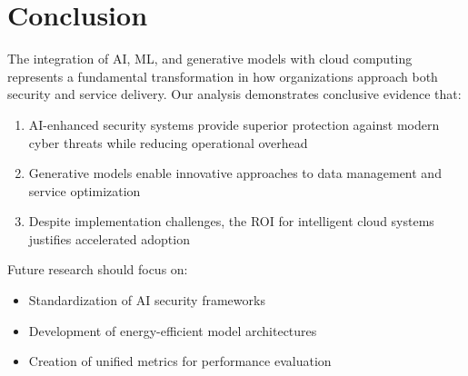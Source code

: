 \documentclass[a4paper,12pt]{article}
\begin{document}
\section{Conclusion}
The integration of AI, ML, and generative models with cloud computing represents a fundamental transformation in how organizations approach both security and service delivery. Our analysis demonstrates conclusive evidence that:
\begin{enumerate}
    \item AI-enhanced security systems provide superior protection against modern cyber threats while reducing operational overhead
    \item Generative models enable innovative approaches to data management and service optimization
    \item Despite implementation challenges, the ROI for intelligent cloud systems justifies accelerated adoption
\end{enumerate}
Future research should focus on:
\begin{itemize}
    \item Standardization of AI security frameworks
    \item Development of energy-efficient model architectures
    \item Creation of unified metrics for performance evaluation
\end{itemize}

\newpage

\nocite{*}


\end{document}
